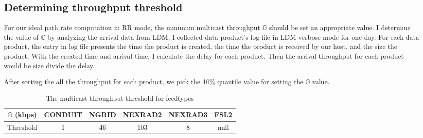 \subsection{Determining throughput threshold}

For our ideal path rate computation in RR mode, the minimum multicast throughput $\mathbb{G}$ should be set an appropriate value. I determine the value of  $\mathbb{G}$ by analyzing the arrival data from LDM. I collected data product's log file in LDM verbose mode for one day. For each data product, the entry in log file presents the time the product is created, the time the product is received by our host, and the size the product. With the created time and arrival time, I calculate the delay for each product. Then the arrival throughput for each product would be size divide the delay.

After sorting the all the throughput for each product, we pick the 10\% quantile value for setting the $\mathbb{G}$ value.

\begin{table}
\centering
\begin{tabular}{| c | c| c| c| c|c|} \hline
$\mathbb{G}$ (kbps) &CONDUIT & NGRID & NEXRAD2 & NEXRAD3 & FSL2\\ \hline
Threshold & 1 & 46 & 103 & 8 & null \\ \hline
\end{tabular}
\caption{The multicast throughput threshold for feedtypes }
\label{tab:gpick}
\end{table}
